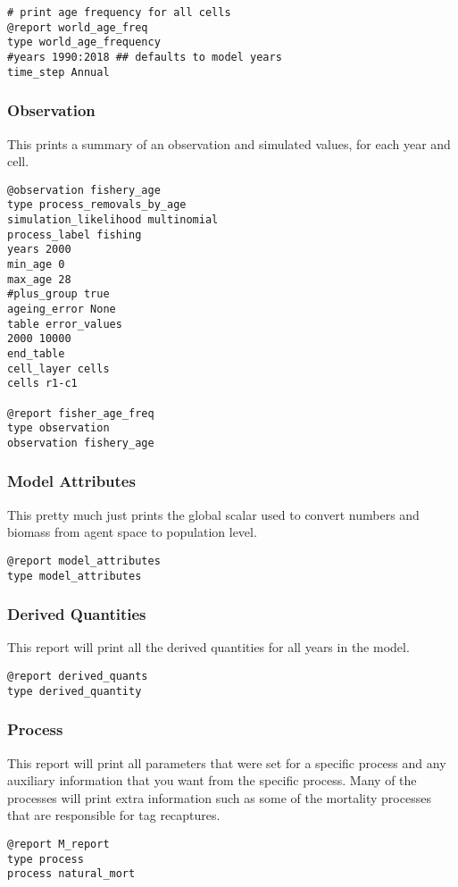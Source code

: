 {\small{\begin{verbatim}
# print age frequency for all cells
@report world_age_freq
type world_age_frequency
#years 1990:2018 ## defaults to model years
time_step Annual
\end{verbatim}}}



\subsubsection{Observation}
This prints a summary of an observation and simulated values, for each year and cell.

{\small{\begin{verbatim}
@observation fishery_age
type process_removals_by_age
simulation_likelihood multinomial
process_label fishing
years 2000
min_age 0
max_age 28
#plus_group true
ageing_error None
table error_values
2000 10000
end_table
cell_layer cells
cells r1-c1	
		
@report fisher_age_freq
type observation
observation fishery_age
\end{verbatim}}}


\subsubsection{Model Attributes}
This pretty much just prints the global scalar used to convert numbers and biomass from agent space to population level.
{\small{\begin{verbatim}
@report model_attributes
type model_attributes
\end{verbatim}}}


\subsubsection{Derived Quantities}
This report will print all the derived quantities for all years in the model.
{\small{\begin{verbatim}
@report derived_quants
type derived_quantity
\end{verbatim}}}

\subsubsection{Process}
This report will print all parameters that were set for a specific process and any auxiliary information that you want from the specific process. Many of the processes will print extra information such as some of the mortality processes that are responsible for tag recaptures.
{\small{\begin{verbatim}
@report M_report
type process
process natural_mort
\end{verbatim}}}


